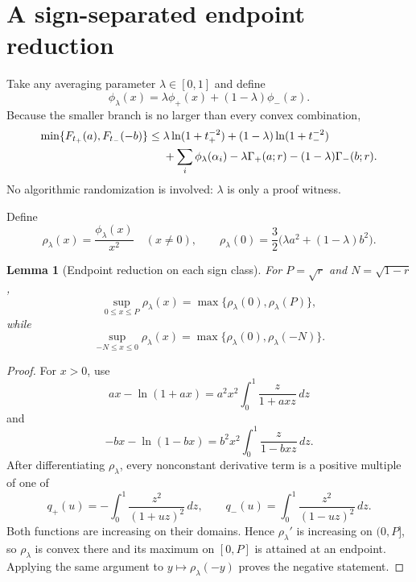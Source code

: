 \documentclass[11pt]{article}
\newtheorem{lemma}[theorem]{Lemma}
\theoremstyle{definition}
\begin{document}
\section{A sign-separated endpoint reduction}

Take any averaging parameter $\lambda\in[0,1]$ and define
\begin{equation}
  \phi_\lambda(x)=\lambda\phi_+(x)+(1-\lambda)\phi_-(x).
  \label{eq:phi-lambda}
\end{equation}
Because the smaller branch is no larger than every convex combination,
\begin{align}
  \min\{F_{t_+}(a),F_{t_-}(-b)\}
  \le{}&\lambda\ln(1+t_+^{-2})+(1-\lambda)\ln(1+t_-^{-2})\notag\\
  &+\sum_i\phi_\lambda(\alpha_i)
  -\lambda\Gamma_+(a;r)-(1-\lambda)\Gamma_-(b;r).
  \label{eq:convex-average}
\end{align}
No algorithmic randomization is involved: $\lambda$ is only a proof witness.

Define
\begin{equation}
  \rho_\lambda(x)=\frac{\phi_\lambda(x)}{x^2}\quad(x\ne0),
  \qquad
  \rho_\lambda(0)=\frac32\bigl(\lambda a^2+(1-\lambda)b^2\bigr).
  \label{eq:rho}
\end{equation}

\begin{lemma}[Endpoint reduction on each sign class]
For $P=\sqrt r$ and $N=\sqrt{1-r}$,
\begin{equation}
  \sup_{0\le x\le P}\rho_\lambda(x)
  =\max\{\rho_\lambda(0),\rho_\lambda(P)\},
  \label{eq:endpoint-positive}
\end{equation}
while
\begin{equation}
  \sup_{-N\le x\le0}\rho_\lambda(x)
  =\max\{\rho_\lambda(0),\rho_\lambda(-N)\}.
  \label{eq:endpoint-negative}
\end{equation}
\end{lemma}

\begin{proof}
For $x>0$, use
\[
  ax-\ln(1+ax)=a^2x^2\int_0^1\frac{z}{1+axz}\,dz
\]
and
\[
  -bx-\ln(1-bx)=b^2x^2\int_0^1\frac{z}{1-bxz}\,dz.
\]
After differentiating $\rho_\lambda$, every nonconstant derivative term is a positive multiple of one of
\[
  q_+(u)=-\int_0^1\frac{z^2}{(1+uz)^2}\,dz,
  \qquad
  q_-(u)=\int_0^1\frac{z^2}{(1-uz)^2}\,dz.
\]
Both functions are increasing on their domains.  Hence $\rho_\lambda'$ is increasing on $(0,P]$, so $\rho_\lambda$ is convex there and its maximum on $[0,P]$ is attained at an endpoint.  Applying the same argument to $y\mapsto\rho_\lambda(-y)$ proves the negative statement.
\end{proof}
\end{document}
